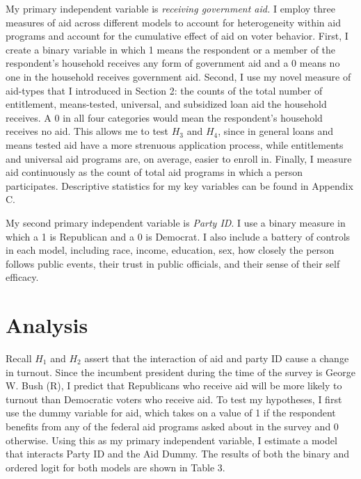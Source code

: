 \documentclass[12pt]{paper}
\begin{document}
My primary independent variable is \textit{receiving government aid.} I employ three measures of aid across different models to account for heterogeneity within aid programs and account for the cumulative effect of aid on voter behavior. First, I create a binary variable in which 1 means the respondent or a member of the respondent’s household receives any form of government aid and a 0 means no one in the household receives government aid. Second, I use my novel measure of aid-types that I introduced in Section 2: the counts of the total number of entitlement, means-tested, universal, and subsidized loan aid the household receives. A 0 in all four categories would mean the respondent’s household receives no aid. This allows me to test $H_3$ and $H_4$, since in general loans and means tested aid have a more strenuous application process, while entitlements and universal aid programs are, on average, easier to enroll in. Finally, I measure aid continuously as the count of total aid programs in which a person participates. Descriptive statistics for my key variables can be found in Appendix C.

My second primary independent variable is \textit{Party ID}. I use a binary measure in which a 1 is Republican and a 0 is Democrat. I also include a battery of controls in each model, including race, income, education, sex, how closely the person follows public events, their trust in public officials, and their sense of their self efficacy.

\section{Analysis}

Recall $H_1$ and $H_2$ assert that the interaction of aid and party ID cause a change in turnout. Since the incumbent president during the time of the survey is George W. Bush (R), I predict that Republicans who receive aid will be more likely to turnout than Democratic voters who receive aid. To test my hypotheses, I first use the dummy variable for aid, which takes on a value of 1 if the respondent benefits from any of the federal aid programs asked about in the survey and 0 otherwise. Using this as my primary independent variable, I estimate a model that interacts Party ID and the Aid Dummy. The results of both the binary and ordered logit for both models are shown in Table 3.
\end{document}
